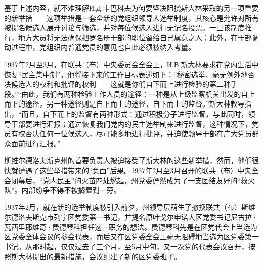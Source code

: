 
基于上述内容，就不难理解И.Д.卡巴科夫为何要坚决阻挠斯大林采取的另一项重要的新举措——这项举措是一套全新的党组织领导人选举制度，其核心是允许对所有被提名候选人展开讨论与筛选，并对每位候选人进行无记名投票。一旦该制度推行，地方大员将无法确保把罗名册干部的职位留给自己属意之人；此外，在干部调动过程中，党组织内普通党员的意见也自此必须被纳入考量。

1937年2月至3月，在联共（布）中央委员会全会上，И.В.斯大林要求在党内生活中恢复“民主集中制”。他将接下来的工作目标表述如下：“秘密选举、毫无例外地否决候选人的权利和批评的权利——这就是你们自下而上进行检验的第二种手段。”“由此，我们有两种检验工作人员的途径：一种是从上级监察机关出发的自上而下的途径，另一种途径则是自下而上的途径，自下而上的监督。”斯大林教导指出，“而且，自下而上的监督有两种形式：通过积极分子进行监督，与此同时，领导干部要进行汇报；通过恢复我们党内的民主选举制来进行监督，这种情况下，党员有权否决任何一位候选人，尽可能多地进行批评，并迫使领导干部在广大党员群众面前进行汇报。”

斯维尔德洛夫斯克州的首要负责人被迫接受了斯大林的这些新举措，然而，他们很快就遭遇了这些举措带来的“负面”后果。1937年2月至3月召开的联共（布）中央全会闭幕后，“党内民主”的火苗四处燃起，州党委俨然成为了一支团结友好的“救火队”。内部纷争不得不被搁置到一旁。

1937年2月，就在新的选举制度被引入前夕，州领导层萌生了撤换联共（布）斯维尔德洛夫斯克市列宁区党委第一书记，并提名原叶戈尔申诺大区党委书记尼古拉·瓦西里耶维奇·费德琴科担任这一职务的想法。费德琴科先是在区党代会上当选为区党委全体会议的参会代表，而后又在区党委全会上毫无阻碍地当选为区党委第一书记。从那时起，仅仅过去了三个月，至5月中旬，又一次党的代表会议召开，按照斯大林提出的最新措施，会议组建了新的区党委班子。

